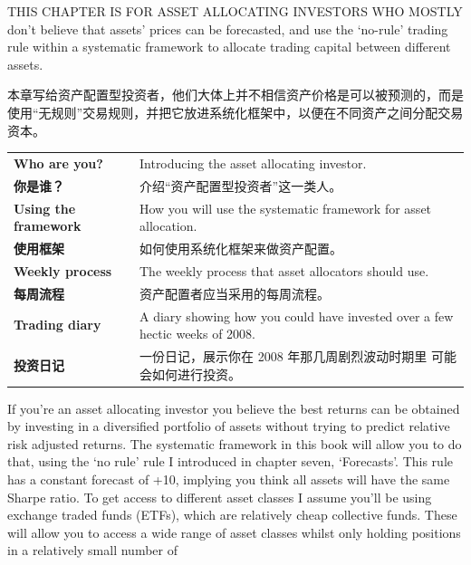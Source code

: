 
\begin{englishblock} THIS CHAPTER IS FOR ASSET ALLOCATING INVESTORS WHO MOSTLY don't believe that assets' prices can be forecasted, and use the ‘no-rule' trading rule within a systematic framework to allocate trading capital between different assets. \end{englishblock}

\begin{chineseblock}本章写给资产配置型投资者，他们大体上并不相信资产价格是可以被预测的，而是使用“无规则”交易规则，并把它放进系统化框架中，以便在不同资产之间分配交易资本。\end{chineseblock}


\begin{bilingualtableblock} \begin{tabularx}{\textwidth}{@{} L{0.30\textwidth} Y@{}}\textbf{Who are you?} & Introducing the asset allocating investor. \\

\textbf{你是谁？} & 介绍“资产配置型投资者”这一类人。 \\
\textbf{Using the framework} & How you will use the systematic framework for asset allocation. \\
\textbf{使用框架} & 如何使用系统化框架来做资产配置。 \\
\textbf{Weekly process} & The weekly process that asset allocators should use. \\
\textbf{每周流程} & 资产配置者应当采用的每周流程。 \\
\textbf{Trading diary} & A diary showing how you could have invested over a few hectic weeks of 2008. \\
\textbf{投资日记} & 一份日记，展示你在 2008 年那几周剧烈波动时期里 可能会如何进行投资。 \\
\end{tabularx}
\end{bilingualtableblock}


\begin{englishblock} If you're an asset allocating investor you believe the best returns can be obtained by investing in a diversified portfolio of assets without trying to predict relative risk adjusted returns. The systematic framework in this book will allow you to do that, using the ‘no rule' rule I introduced in chapter seven, ‘Forecasts'. This rule has a constant forecast of +10, implying you think all assets will have the same Sharpe ratio. To get access to different asset classes I assume you'll be using exchange traded funds (ETFs), which are relatively cheap collective funds. These will allow you to access a wide range of asset classes whilst only holding positions in a relatively small number of \end{englishblock}

